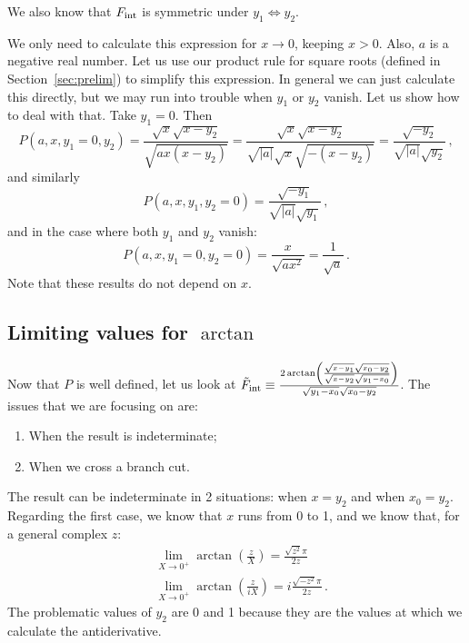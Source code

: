 \documentclass[twoside]{article}
\begin{document}
We also know that $F_{\rm int}$ is symmetric under $y_1 \Leftrightarrow y_2$.


We only need to calculate this expression for $x \to 0$, keeping $x>0$. Also, $a$ is a negative real number. Let us use our product rule for square roots (defined in Section~\ref{sec:prelim}) to simplify this expression. In general we can just calculate this directly, but we may run into trouble when $y_1$ or $y_2$ vanish. Let us show how to deal with that.
Take $y_1=0$. Then
\begin{equation}
P(a,x,y_1=0,y_2) = \frac{\sqrt{x}\sqrt{x-y_2}}{\sqrt{a x (x-y_2)}} = \frac{\sqrt{x}\sqrt{x-y_2}}{\sqrt{|a|}\sqrt{x}\sqrt{-(x-y_2)}} =  \frac{\sqrt{-y_2}}{\sqrt{|a|}\sqrt{y_2}}\,,
\end{equation}
and similarly
\begin{equation}
P(a,x,y_1,y_2=0) =  \frac{\sqrt{-y_1}}{\sqrt{|a|}\sqrt{y_1}}\,,
\end{equation}
and in the case where both $y_1$ and $y_2$ vanish:
\begin{equation}
P(a,x,y_1=0,y_2=0) = \frac{x}{\sqrt{a x^2}} = \frac{1}{\sqrt{a}} \,.
\end{equation}
Note that these results do not depend on $x$.

\subsection{Limiting values for $\arctan$}

Now that $P$ is well defined, let us look at $\tilde{F}_{\rm int} \equiv \frac{2 \arctan\left(\frac{\sqrt{x-y_1} \sqrt{x_0-y_2}}{\sqrt{x-y_2} \sqrt{y_1-x_0}}\right)}{\sqrt{y_1 - x_0}\sqrt{x_0 - y_2}}$. The issues that we are focusing on are:
\begin{enumerate}
\item When the result is indeterminate;
\item When we cross a branch cut.
\end{enumerate}

The result can be indeterminate in 2 situations: when $x=y_2$ and when $x_0 = y_2$.
Regarding the first case, we know that $x$ runs from 0 to 1, and we know that, for a general complex $z$:
\begin{align}
&\lim_{X \to 0^+} \arctan\left(\frac{z}{X}\right) = \frac{\sqrt{z^2}\pi}{2 z} \label{eq:limit1}\\
&\lim_{X \to 0^+} \arctan\left(\frac{z}{i X}\right) = i \frac{\sqrt{-z^2}\pi}{2 z}\,. \label{eq:limit2}
\end{align} 
The problematic values of $y_2$ are 0 and 1 because they are the values at which we calculate the antiderivative. 
\end{document}
